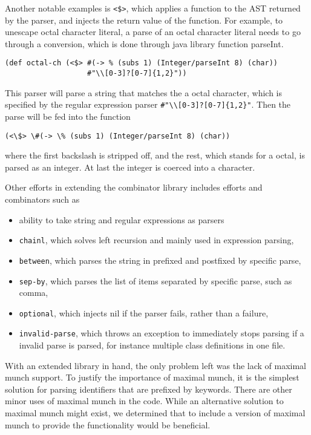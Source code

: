 \documentclass[12pt]{article}
\begin{document}
Another notable examples is \verb'<$>', which applies a function to the AST
returned by the parser, and injects the return value of the function. For
example, to unescape octal character literal, a parse of an octal character
literal needs to go through a conversion, which is done through java library
function parseInt.

\begin{verbatim}
(def octal-ch (<$> #(-> % (subs 1) (Integer/parseInt 8) (char))
                   #"\\[0-3]?[0-7]{1,2}"))
\end{verbatim}

This parser will parse a string that matches the a octal character, which is
specified by the regular expression parser \verb'#"\\[0-3]?[0-7]{1,2}"'.
Then the parse will be fed into the function

\begin{verbatim}
(<\$> \#(-> \% (subs 1) (Integer/parseInt 8) (char))
\end{verbatim}

\noindent where the first backslash is stripped off, and the rest, which stands
for a octal, is parsed as an integer. At last the integer is coerced into a
character.

\begin{samepage}
Other efforts in extending the combinator library includes efforts and
combinators such as
\begin{itemize}
\item ability to take string and regular expressions as parsers
\item \texttt{chainl}, which solves left recursion and mainly used in expression parsing,
\item \texttt{between}, which parses the string in prefixed and postfixed by specific parse,
\item \texttt{sep-by}, which parses the list of items separated by specific parse, such as comma,
\item \texttt{optional}, which injects nil if the parser fails, rather than a failure,
\item \texttt{invalid-parse}, which throws an exception to immediately stops parsing if a
  invalid parse is parsed, for instance multiple class definitions in one file.
\end{itemize}
\end{samepage}

With an extended library in hand, the only problem left was the lack of maximal
munch support. To justify the importance of maximal munch, it is the simplest
solution for parsing identifiers that are prefixed by keywords. There are other
minor uses of maximal munch in the code. While an alternative solution to
maximal munch might exist, we determined that to include a version of maximal
munch to provide the functionality would be beneficial.
\end{document}
